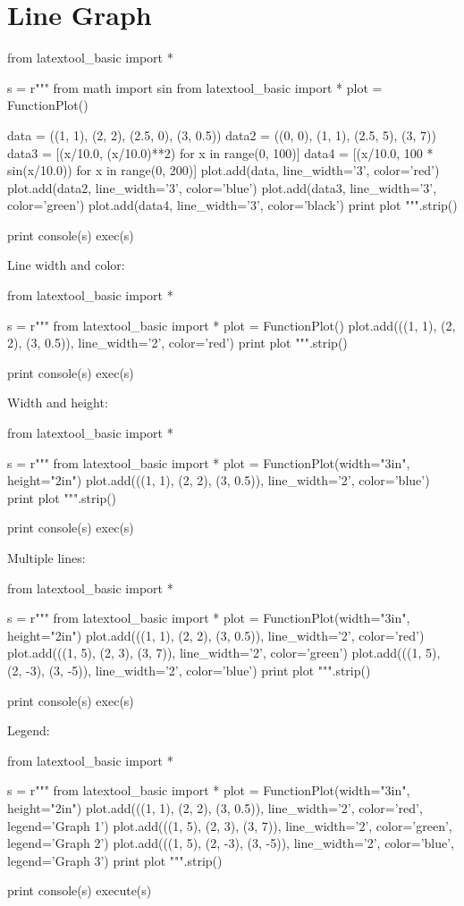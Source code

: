 \section{Line Graph}

\begin{python}
from latextool_basic import *

s = r"""
from math import sin
from latextool_basic import *
plot = FunctionPlot()

data = ((1, 1), (2, 2), (2.5, 0), (3, 0.5))
data2 = ((0, 0), (1, 1), (2.5, 5), (3, 7))
data3 = [(x/10.0, (x/10.0)**2) for x in range(0, 100)]
data4 = [(x/10.0, 100 * sin(x/10.0)) for x in range(0, 200)]
plot.add(data, line_width='3', color='red')
plot.add(data2, line_width='3', color='blue')
plot.add(data3, line_width='3', color='green')
plot.add(data4, line_width='3', color='black')
print plot
""".strip()

print console(s)
exec(s)
\end{python}


Line width and color:
\begin{python}
from latextool_basic import *

s = r"""
from latextool_basic import *
plot = FunctionPlot()
plot.add(((1, 1), (2, 2), (3, 0.5)), line_width='2', color='red')
print plot
""".strip()

print console(s)
exec(s)
\end{python}


Width and height:
\begin{python}
from latextool_basic import *

s = r"""
from latextool_basic import *
plot = FunctionPlot(width="3in", height="2in")
plot.add(((1, 1), (2, 2), (3, 0.5)), line_width='2', color='blue')
print plot
""".strip()

print console(s)
exec(s)
\end{python}


Multiple lines:
\begin{python}
from latextool_basic import *

s = r"""
from latextool_basic import *
plot = FunctionPlot(width="3in", height="2in")
plot.add(((1, 1), (2, 2), (3, 0.5)), line_width='2', color='red')
plot.add(((1, 5), (2, 3), (3, 7)), line_width='2', color='green')
plot.add(((1, 5), (2, -3), (3, -5)), line_width='2', color='blue')
print plot
""".strip()

print console(s)
exec(s)
\end{python}


Legend:
\begin{python}
from latextool_basic import *

s = r"""
from latextool_basic import *
plot = FunctionPlot(width="3in", height="2in")
plot.add(((1, 1), (2, 2), (3, 0.5)), line_width='2', color='red', legend='Graph 1')
plot.add(((1, 5), (2, 3), (3, 7)), line_width='2', color='green', legend='Graph 2')
plot.add(((1, 5), (2, -3), (3, -5)), line_width='2', color='blue', legend='Graph 3')
print plot
""".strip()

print console(s)
execute(s)
\end{python}



